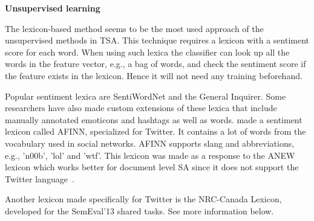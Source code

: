 \noindent
\textbf{Unsupervised learning} \\
\noindent 

The lexicon-based method seems to be the most used approach of the unsupervised methods in TSA. This technique requires a lexicon with a sentiment score for each word. When using such lexica the classifier can look up all the words in the feature vector, e.g., a bag of words, and check the sentiment score if the feature exists in the lexicon. Hence it will not need any training beforehand.
	
Popular sentiment lexica are SentiWordNet and the General Inquirer. Some researchers have also made custom extensions of these lexica that include manually annotated emoticons and hashtags as well as words. \cite{article:afinn} made a sentiment lexicon called AFINN, specialized for Twitter. It contains a lot of words from the vocabulary used in social networks. AFINN supports slang and abbreviations, e.g., 'n00b', 'lol' and 'wtf'. This lexicon was made as a response to the ANEW lexicon which works better for document level SA since it does not support the Twitter language~\citep{article:afinn}. 

Another lexicon made specifically for Twitter is the NRC-Canada Lexicon, developed for the SemEval'13 shared tasks. See more information below.